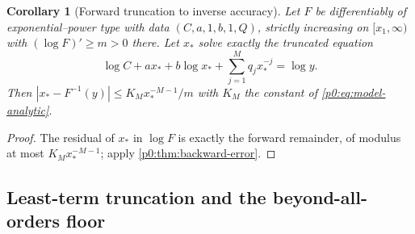 \documentclass[11pt,a4paper,oneside]{book}
\theoremstyle{plain}
\newtheorem{corollary}[theorem]{Corollary}
\theoremstyle{definition}
\theoremstyle{remark}
\begin{document}
\begin{corollary}[Forward truncation to inverse accuracy]
\label{p0:cor:forward-to-inverse}
Let $F$ be differentiably of exponential--power type with data
$(C,a,1,b,1,Q)$, strictly increasing on $[x_1,\infty)$ with
$(\log F)'\ge m>0$ there.  Let $x_\ast$ solve exactly the truncated equation
\[
 \log C+ax_\ast+b\log x_\ast+\sum_{j=1}^{M}q_jx_\ast^{-j}=\log y .
\]
Then $|x_\ast-F^{-1}(y)|\le K_Mx_\ast^{-M-1}/m$ with $K_M$ the constant of
\eqref{p0:eq:model-analytic}.
\end{corollary}

\begin{proof}
The residual of $x_\ast$ in $\log F$ is exactly the forward remainder, of
modulus at most $K_Mx_\ast^{-M-1}$; apply
\cref{p0:thm:backward-error}.
\end{proof}

\subsection{Least-term truncation and the beyond-all-orders floor}
\end{document}
